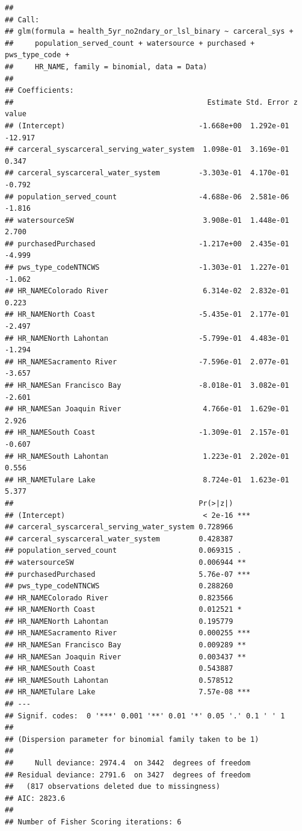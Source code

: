 \documentclass[
]{article}
\begin{document}
\begin{verbatim}
## 
## Call:
## glm(formula = health_5yr_no2ndary_or_lsl_binary ~ carceral_sys + 
##     population_served_count + watersource + purchased + pws_type_code + 
##     HR_NAME, family = binomial, data = Data)
## 
## Coefficients:
##                                             Estimate Std. Error z value
## (Intercept)                               -1.668e+00  1.292e-01 -12.917
## carceral_syscarceral_serving_water_system  1.098e-01  3.169e-01   0.347
## carceral_syscarceral_water_system         -3.303e-01  4.170e-01  -0.792
## population_served_count                   -4.688e-06  2.581e-06  -1.816
## watersourceSW                              3.908e-01  1.448e-01   2.700
## purchasedPurchased                        -1.217e+00  2.435e-01  -4.999
## pws_type_codeNTNCWS                       -1.303e-01  1.227e-01  -1.062
## HR_NAMEColorado River                      6.314e-02  2.832e-01   0.223
## HR_NAMENorth Coast                        -5.435e-01  2.177e-01  -2.497
## HR_NAMENorth Lahontan                     -5.799e-01  4.483e-01  -1.294
## HR_NAMESacramento River                   -7.596e-01  2.077e-01  -3.657
## HR_NAMESan Francisco Bay                  -8.018e-01  3.082e-01  -2.601
## HR_NAMESan Joaquin River                   4.766e-01  1.629e-01   2.926
## HR_NAMESouth Coast                        -1.309e-01  2.157e-01  -0.607
## HR_NAMESouth Lahontan                      1.223e-01  2.202e-01   0.556
## HR_NAMETulare Lake                         8.724e-01  1.623e-01   5.377
##                                           Pr(>|z|)    
## (Intercept)                                < 2e-16 ***
## carceral_syscarceral_serving_water_system 0.728966    
## carceral_syscarceral_water_system         0.428387    
## population_served_count                   0.069315 .  
## watersourceSW                             0.006944 ** 
## purchasedPurchased                        5.76e-07 ***
## pws_type_codeNTNCWS                       0.288260    
## HR_NAMEColorado River                     0.823566    
## HR_NAMENorth Coast                        0.012521 *  
## HR_NAMENorth Lahontan                     0.195779    
## HR_NAMESacramento River                   0.000255 ***
## HR_NAMESan Francisco Bay                  0.009289 ** 
## HR_NAMESan Joaquin River                  0.003437 ** 
## HR_NAMESouth Coast                        0.543887    
## HR_NAMESouth Lahontan                     0.578512    
## HR_NAMETulare Lake                        7.57e-08 ***
## ---
## Signif. codes:  0 '***' 0.001 '**' 0.01 '*' 0.05 '.' 0.1 ' ' 1
## 
## (Dispersion parameter for binomial family taken to be 1)
## 
##     Null deviance: 2974.4  on 3442  degrees of freedom
## Residual deviance: 2791.6  on 3427  degrees of freedom
##   (817 observations deleted due to missingness)
## AIC: 2823.6
## 
## Number of Fisher Scoring iterations: 6
\end{verbatim}
\end{document}
